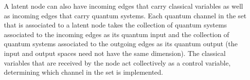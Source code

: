 \documentclass[aps,english,superscriptaddress,onecolumn,twoside,longbibliography,pra,floatfix,fleqn,nofootinbib]{revtex4-1}%
\theoremstyle{definition}
\begin{document}
%
A latent node can also have incoming edges that carry classical variables as well as incoming edges that carry quantum systems.   Each quantum channel in the set that is associated to a latent node takes the collection of quantum systems associated to the incoming edges as its quantum input and the collection of quantum systems associated to the outgoing edges as its quantum output (the input and output spaces need not have the same dimension).  The classical variables that are received by the node act collectively as a control variable, determining which channel in the set is implemented.






\end{document}
